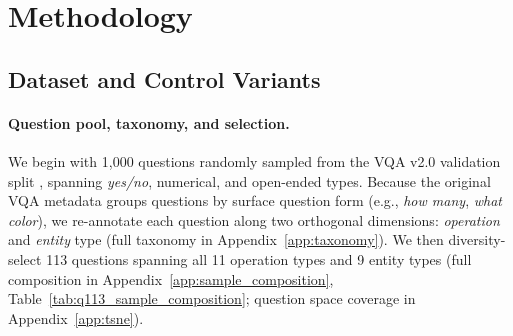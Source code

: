 \documentclass[letterpaper]{article}
\begin{document}
\section{Methodology}
\label{sec:setup}

\subsection{Dataset and Control Variants}
\label{sec:dataset}


\paragraph{Question pool, taxonomy, and selection.}
We begin with 1{,}000 questions randomly sampled from the VQA v2.0 validation split
\citep{goyal2016making}, spanning \textit{yes/no}, numerical, and open-ended types.
Because the original VQA metadata groups questions by surface question form (e.g., \textit{how many}, \textit{what color}), we re-annotate each question along two orthogonal dimensions: \emph{operation} and \emph{entity} type (full taxonomy in Appendix~\ref{app:taxonomy}). 
We then diversity-select 113 questions spanning all 11 operation types and 9 entity types (full composition in Appendix~\ref{app:sample_composition}, Table~\ref{tab:q113_sample_composition}; question space coverage in Appendix~\ref{app:tsne}).

\end{document}
